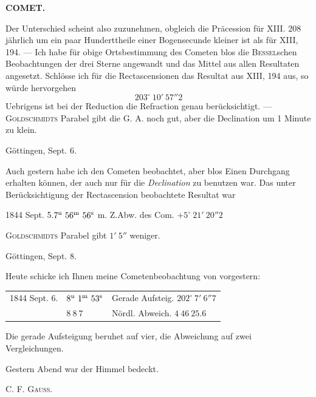 \clearpage
\noindent{}%
\makebox[12mm][l]{}%
\parbox[t]{\dimexpr\linewidth-24mm\relax}{\centering\footnotesize\bfseries COMET.\par}%
\par\nobreak\medskip
\noindent Der Unterschied scheint also zuzunehmen, obgleich die Präcession für XIII. 208 jährlich um ein paar Hunderttheile einer Bogensecunde kleiner ist als für XIII, 194. --- Ich habe für obige Ortsbestimmung des Cometen blos die \textsc{Bessel}schen Beobachtungen der drei Sterne angewandt und das Mittel aus allen Resultaten angesetzt. Schlösse ich für die Rectascensionen das Resultat aus XIII, 194 aus, so würde hervorgehen
\[
203^\circ\ 10'\ 57''2
\]
\noindent Uebrigens ist bei der Reduction die Refraction genau berücksichtigt. --- \textsc{Goldschmidts} Parabel gibt die G. A. noch gut, aber die Declination um 1 Minute zu klein.

\begin{flushright}Göttingen, Sept. 6.\end{flushright}

Auch gestern habe ich den Cometen beobachtet, aber blos Einen Durchgang erhalten können, der auch nur für die \emph{Declination} zu benutzen war. Das unter Berücksichtigung der Rectascension beobachtete Resultat war

\begin{center}
1844 Sept. 5.\quad $7^{\rm u}\ 56^{\rm m}\ 56^{\rm s}$ m. Z.\quad Abw. des Com. $+5^\circ\ 21'\ 20''2$
\end{center}

\textsc{Goldschmidts} Parabel gibt $1'\ 5''$ weniger.

\begin{flushright}Göttingen, Sept. 8.\end{flushright}

Heute schicke ich Ihnen meine Cometenbeobachtung von vorgestern:

\begin{center}
\setlength{\tabcolsep}{3pt}
\begin{tabular}{lll}
1844 Sept. 6. & $8^{\rm u}\ 1^{\rm m}\ 53^{\rm s}$ & Gerade Aufsteig. $202^\circ\ 7'\ 6''7$ \\
 & $8\ 8\ 7$ & Nördl. Abweich. $4\ 46\ 25.6$ \\
\end{tabular}
\end{center}

Die gerade Aufsteigung beruhet auf vier, die Abweichung auf zwei Vergleichungen.

Gestern Abend war der Himmel bedeckt.
\begin{flushright}C. F. \textsc{Gauss}.\end{flushright}
